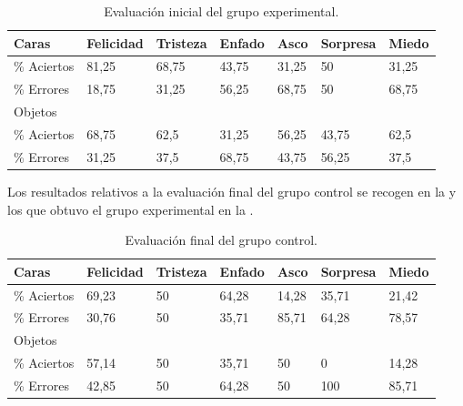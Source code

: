 \documentclass[spanish]{textolivre}
\begin{document}
\begin{table}[h!]
\centering
\begin{threeparttable}
\caption{Evaluación inicial del grupo experimental.}
\label{tab02}
\begin{tabular}{l l l l l l l}
\toprule
 Caras & Felicidad & Tristeza & Enfado & Asco & Sorpresa & Miedo \\
 \midrule
\% Aciertos & 81,25 & 68,75 & 43,75 & 31,25 & 50 & 31,25  \\
\% Errores & 18,75 & 31,25 & 56,25 & 68,75 & 50 & 68,75  \\
Objetos & & & & & & \\
\% Aciertos & 68,75 & 62,5 & 31,25 & 56,25 & 43,75 & 62,5 \\
\% Errores & 31,25 & 37,5 & 68,75 & 43,75 & 56,25 & 37,5 \\
\bottomrule
\end{tabular}
\end{threeparttable}
\end{table}

Los resultados relativos a la evaluación final del grupo control se recogen en la  y los que obtuvo el grupo experimental en la .

\begin{table}[h!]
\centering
\begin{threeparttable}
\caption{Evaluación final del grupo control.}
\label{tab03}
\begin{tabular}{l l l l l l l}
\toprule
 Caras & Felicidad & Tristeza & Enfado & Asco & Sorpresa & Miedo \\
 \midrule
\% Aciertos & 69,23 & 50 & 64,28 & 14,28 & 35,71 & 21,42 \\
\% Errores & 30,76 & 50 & 35,71 & 85,71 & 64,28 & 78,57 \\
Objetos & & & & & & \\
\% Aciertos & 57,14 & 50 & 35,71 & 50 & 0 & 14,28 \\
\% Errores & 42,85 & 50 & 64,28 & 50 & 100 & 85,71 \\
\bottomrule
\end{tabular}
\end{threeparttable}
\end{table}
\end{document}
